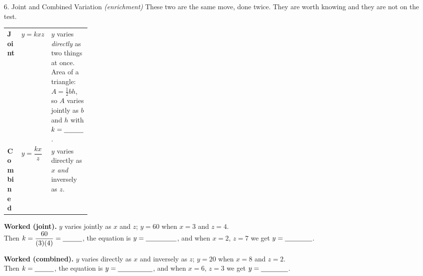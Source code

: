 \documentclass[10pt]{article}
\begin{document}
\begin{notesbox}{6. Joint and Combined Variation \emph{(enrichment)}}
{\small These two are the same move, done twice. They are worth knowing and they are not on the test.}

\vspace{3pt}
\begin{center}
\renewcommand{\arraystretch}{1.35}
\begin{tabularx}{\linewidth}{@{}p{0.20\linewidth} l X@{}}
\hline
\textbf{Joint} & $y=kxz$ & $y$ varies \emph{directly} as two things at once. Area of a triangle: $A=\frac12 bh$, so $A$ varies jointly as $b$ and $h$ with $k=\blank{1.0cm}$. \\
\textbf{Combined} & $y=\dfrac{kx}{z}$ & $y$ varies directly as $x$ \emph{and} inversely as $z$. \\
\hline
\end{tabularx}
\end{center}

\vspace{3pt}
\textbf{Worked (joint).} $y$ varies jointly as $x$ and $z$; $y=60$ when $x=3$ and $z=4$. \\
Then $k=\dfrac{60}{(3)(4)}=\blank{1.0cm}$, the equation is $y=\blank{1.6cm}$, and when $x=2$,
$z=7$ we get $y=\blank{1.4cm}$.

\vspace{3pt}
\textbf{Worked (combined).} $y$ varies directly as $x$ and inversely as $z$; $y=20$ when $x=8$ and
$z=2$. \\
Then $k=\blank{1.0cm}$, the equation is $y=\blank{1.8cm}$, and when $x=6$, $z=3$ we get
$y=\blank{1.4cm}$.
\end{notesbox}
\end{document}
